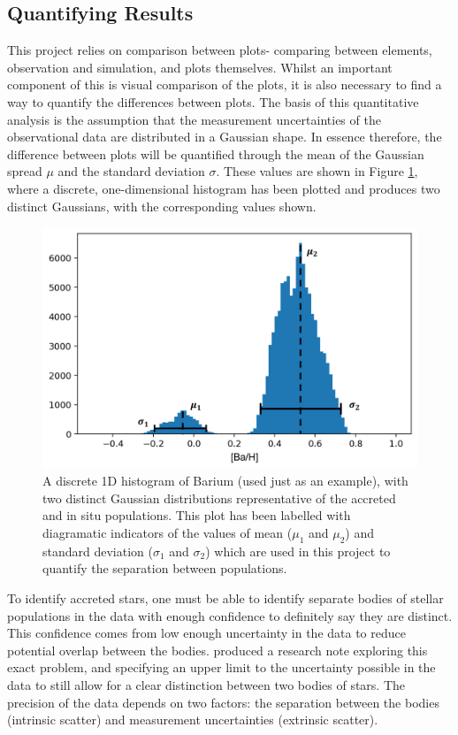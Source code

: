 \documentclass[fleqn,usenatbib]{mnras}
\begin{document}
 
 \subsection{Quantifying Results}
\label{subsec:quant}
This project relies on comparison between plots- comparing between elements, observation and simulation, and plots themselves. Whilst an important component of this is visual comparison of the plots, it is also necessary to find a way to quantify the differences between plots. The basis of this quantitative analysis is the assumption that the measurement uncertainties of the observational data are distributed in a Gaussian shape. In essence therefore, the difference between plots will be quantified through the mean of the Gaussian spread $\mu$ and the standard deviation $\sigma$. These values are shown in Figure \ref{fig:hist_labels}, where a discrete, one-dimensional histogram has been plotted and produces two distinct Gaussians, with the corresponding values shown. 
\begin{figure}
	\includegraphics[width=\columnwidth]{hist_labelled.png}
    \caption{A discrete 1D histogram of Barium (used just as an example), with two distinct Gaussian distributions representative of the accreted and in situ populations. This plot has been labelled with diagramatic indicators of the values of mean ($\mu_1$ and $\mu_2$) and standard deviation ($\sigma_1$ and $\sigma_2$) which are used in this project to quantify the separation between populations.}
    \label{fig:hist_labels}
\end{figure}

 
To identify accreted stars, one must be able to identify separate bodies of stellar populations in the data with enough confidence to definitely say they are distinct. This confidence comes from low enough uncertainty in the data to reduce potential overlap between the bodies. \citet{Lindegren2013} produced a research note exploring this exact problem, and specifying an upper limit to the uncertainty possible in the data to still allow for a clear distinction between two bodies of stars. The precision of the data depends on two factors: the separation between the bodies (intrinsic scatter) and measurement uncertainties (extrinsic scatter). 
\end{document}
